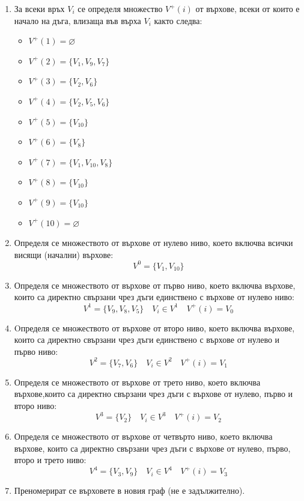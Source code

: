 \documentclass[fleqn, 12pt]{article}
\theoremstyle{definition}
\begin{document}
\begin{enumerate}
\item За всеки връх $V_i$ се определя	множество $V^+ (i)$ от върхове, всеки от които е начало на дъга, влизаща във върха $V_i$ както следва:
\begin{itemize}
\item $V^+ (1)  = \varnothing $
\item $V^+ (2) = \{ V_1, V_9, V_7 \}$
\item $V^+ (3) = \{ V_2, V_6 \}$
\item $V^+ (4) = \{ V_2, V_5, V_6 \}$
\item $V^+ (5) = \{ V_{10} \}$
\item $V^+ (6) = \{ V_8 \}$
\item $V^+ (7) = \{ V_1, V_10, V_8 \}$
\item $V^+ (8) = \{ V_{10} \}$
\item $V^+ (9) = \{ V_{10} \}$
\item $V^+ (10) = \varnothing $
\end{itemize}
\item Определя се множеството от върхове от нулево ниво, което включва всички висящи (начални) върхове: 
$$V^0 = \{ V_1, V_10\}$$
\item Определя се множеството от върхове от първо ниво, което включва върхове, които са директно свързани чрез дъги единствено с върхове от нулево ниво:
$$V^1 = \{V_9, V_8, V_5 \} \quad V_i \in  V^1 \quad V^+(i) = V_0$$
\item Oпределя се множеството от върхове от второ ниво, което включва върхове, които са директно свързани чрез дъги единствено с върхове от нулево и първо ниво:
$$V^2 = \{V_7, V_6 \} \quad V_i \in  V^2 \quad V^+(i) = V_1$$
\item Определя се множеството от върхове от трето ниво, което включва върхове,които са директно свързани чрез дъги с върхове от нулево, първо и второ ниво:
$$V^3 = \{V_2 \} \quad V_i \in  V^3 \quad V^+(i) = V_2$$
\item Определя се множеството от върхове от четвърто ниво, което включва върхове, които са директно свързани чрез дъги с върхове от нулево, първо, второ и трето ниво:
$$V^4 = \{V_3, V_9 \} \quad V_i \in  V^4 \quad V^+(i) = V_3$$
\item Преномерират се върховете в новия граф (не е задължително).
\end{enumerate}
\end{document}
